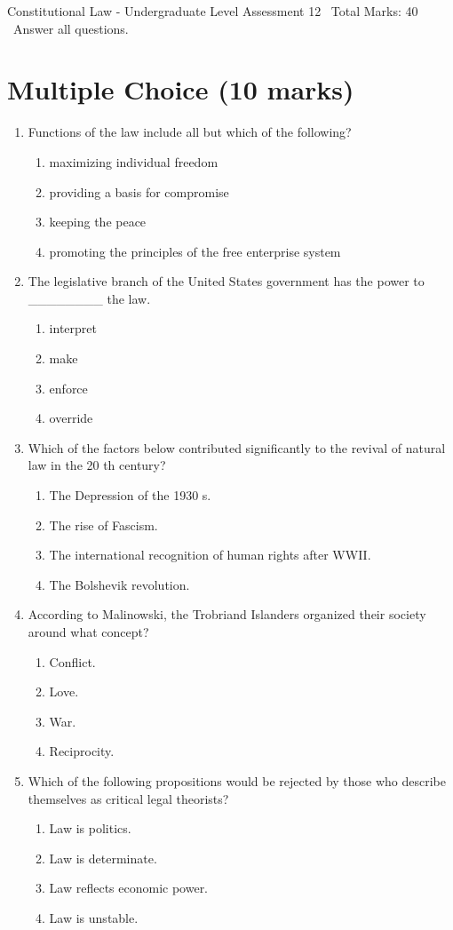 \documentclass[12pt]{article}
\begin{document}
\begin{center}
Constitutional Law - Undergraduate Level Assessment 12 \
Total Marks: 40 \
Answer all questions.
\end{center}

\section*{Multiple Choice (10 marks)}
\begin{enumerate}[label=\arabic*.]
\item Functions of the law include all but which of the following?
\begin{enumerate}[label=(\alph*)]
    \item maximizing individual freedom
    \item providing a basis for compromise
    \item keeping the peace
    \item promoting the principles of the free enterprise system
\end{enumerate}
\item The legislative branch of the United States government has the power to \_\_\_\_\_\_\_\_ the law.
\begin{enumerate}[label=(\alph*)]
    \item interpret
    \item make
    \item enforce
    \item override
\end{enumerate}
\item Which of the factors below contributed significantly to the revival of natural law in the 20 th century?
\begin{enumerate}[label=(\alph*)]
    \item The Depression of the 1930 s.
    \item The rise of Fascism.
    \item The international recognition of human rights after WWII.
    \item The Bolshevik revolution.
\end{enumerate}
\item According to Malinowski, the Trobriand Islanders organized their society around what concept?
\begin{enumerate}[label=(\alph*)]
    \item Conflict.
    \item Love.
    \item War.
    \item Reciprocity.
\end{enumerate}
\item Which of the following propositions would be rejected by those who describe themselves as critical legal theorists?
\begin{enumerate}[label=(\alph*)]
    \item Law is politics.
    \item Law is determinate.
    \item Law reflects economic power.
    \item Law is unstable.
\end{enumerate}
\end{enumerate}
\end{document}

